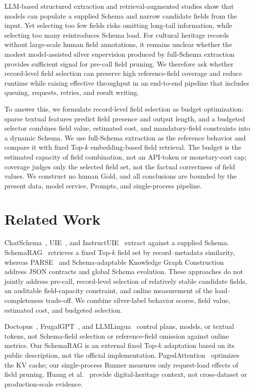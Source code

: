 \documentclass[runningheads]{llncs}
\newcommand{\schemarag}{SchemaRAG}
\begin{document}
LLM-based structured extraction and retrieval-augmented studies show that models can populate a supplied Schema and narrow candidate fields from the input. Yet selecting too few fields risks omitting long-tail information, while selecting too many reintroduces Schema load. For cultural heritage records without large-scale human field annotations, it remains unclear whether the modest model-assisted silver supervision produced by full-Schema extraction provides sufficient signal for pre-call field pruning. We therefore ask whether record-level field selection can preserve high reference-field coverage and reduce runtime while raising effective throughput in an end-to-end pipeline that includes queuing, requests, retries, and result writing.

To answer this, we formulate record-level field selection as budget optimization: sparse textual features predict field presence and output length, and a budgeted selector combines field value, estimated cost, and mandatory-field constraints into a dynamic Schema. We use full-Schema extraction as the reference behavior and compare it with fixed Top-$k$ embedding-based field retrieval. The budget is the estimated capacity of field combination, not an API-token or monetary-cost cap; coverage judges only the selected field set, not the factual correctness of field values. We construct no human Gold, and all conclusions are bounded by the present data, model service, Prompts, and single-process pipeline.

\section{Related Work}

ChatSchema~\cite{chatschema}, UIE~\cite{uie}, and InstructUIE~\cite{instructuie} extract against a supplied Schema. \schemarag{}~\cite{schemarag} retrieves a fixed Top-$k$ field set by record--metadata similarity, whereas PARSE~\cite{parse} and Schema-adaptable Knowledge Graph Construction~\cite{adakgc} address JSON contracts and global Schema evolution. These approaches do not jointly address pre-call, record-level selection of relatively stable candidate fields, an auditable field-capacity constraint, and online measurement of the load--completeness trade-off. We combine silver-label behavior scores, field value, estimated cost, and budgeted selection.

Doctopus~\cite{doctopus}, FrugalGPT~\cite{frugalgpt}, and LLMLingua~\cite{llmlingua} control plans, models, or textual tokens, not Schema-field selection or reference-field omission against online metrics. Our \schemarag{} is an external fixed Top-$k$ adaptation based on its public description, not the official implementation. PagedAttention~\cite{pagedattention} optimizes the KV cache; our single-process Runner measures only request-load effects of field pruning. Huang et al.~\cite{huang2023} provide digital-heritage context, not cross-dataset or production-scale evidence.
\end{document}
